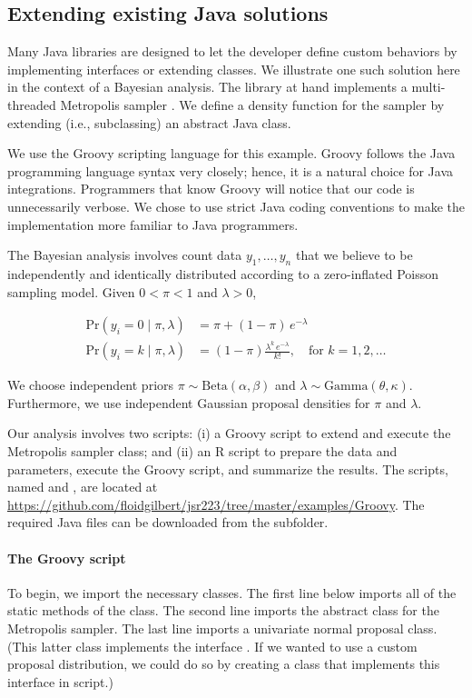 \hypertarget{extending-existing-java-solutions}{}
\subsection{Extending existing Java solutions}

Many Java libraries are designed to let the developer define custom behaviors by implementing interfaces or extending classes. We illustrate one such solution here in the context of a Bayesian analysis. The library at hand implements a multi-threaded Metropolis sampler \citep{metropolis}. We define a density function for the sampler by extending (i.e., subclassing) an abstract Java class.

We use the Groovy scripting language for this example. Groovy follows the Java programming language syntax very closely; hence, it is a natural choice for Java integrations. Programmers that know Groovy will notice that our code is unnecessarily verbose. We chose to use strict Java coding conventions to make the implementation more familiar to Java programmers.

The Bayesian analysis involves count data $y_1,\dots,y_n$ that we believe to be independently and identically distributed according to a zero-inflated Poisson sampling model. Given $0 < \pi < 1$ and $\lambda > 0$,

\begin{align*}
\text{Pr}(y_i = 0 \mid \pi, \lambda) &= \pi + (1-\pi) \, e^{-\lambda} \\
\text{Pr}(y_i = k \mid \pi, \lambda) &= (1  -\pi) \frac{\lambda^k \, e^{-\lambda}}{k!}, \quad \text{for } k = 1, 2, \ldots
\end{align*}

We choose independent priors $\pi \sim \text{Beta}(\alpha,\beta)$ and $\lambda \sim \text{Gamma}(\theta,\kappa)$. Furthermore, we use independent Gaussian proposal densities for $\pi$ and $\lambda$.

Our analysis involves two scripts: (i) a Groovy script to extend and execute the Metropolis sampler class; and (ii) an R script to prepare the data and parameters, execute the Groovy script, and summarize the results. The scripts, named  and , are located at \url{https://github.com/floidgilbert/jsr223/tree/master/examples/Groovy}. The required Java files can be downloaded from the  subfolder.

\paragraph{The Groovy script} To begin, we import the necessary classes. The first line below imports all of the static methods of the  class. The second line imports the abstract class for the Metropolis sampler. The last line imports a univariate normal proposal class. (This latter class implements the interface . If we wanted to use a custom proposal distribution, we could do so by creating a class that implements this interface in script.)

